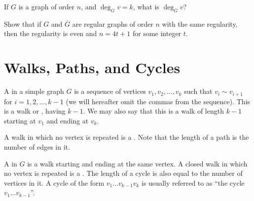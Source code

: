 \begin{Exercise}
If $G$ is a graph of order $n$, and $\deg_G v = k$, what is $\deg_{\overline G} v$?
\end{Exercise}

\begin{Exercise}
Show that if $G$ and $\overline G$ are regular graphs of order $n$ with the same regularity, then the regularity is even and $n = 4t + 1$ for some integer $t$.
\end{Exercise}


\section{Walks, Paths, and Cycles}\label{sec:Walks}

A  in a simple graph $G$ is a sequence of vertices $v_1, v_2, \ldots, v_k$ such that $v_i \sim v_{i + 1}$ for $i = 1, 2, \ldots, k - 1$ (we will hereafter omit the commas from the sequence). This is a walk  or , having  $k - 1$. We may also say that this is a walk of length $k - 1$ starting at $v_1$ and ending at $v_k$.

A walk in which no vertex is repeated is a . Note that the length of a path is the number of edges in it.

A  in $G$ is a walk starting and ending at the same vertex. A closed walk in which no vertex is repeated is a . The length of a cycle is also equal to the number of vertices in it. A cycle of the form $v_1 \ldots v_{k-1} v_k$ is usually referred to as ``the cycle $v_1 \ldots v_{k-1}$''.

